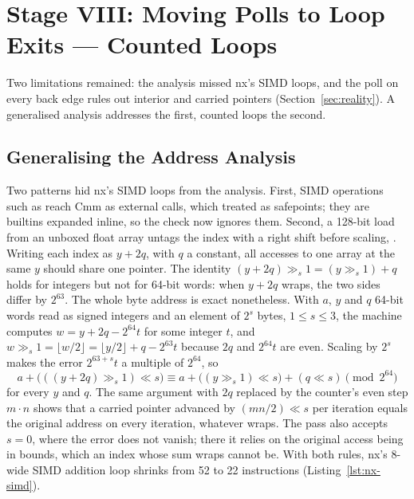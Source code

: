 \section{Stage VIII: Moving Polls to Loop Exits --- Counted Loops}
\label{sec:counted}

Two limitations remained: the analysis missed nx's SIMD loops, and the poll
on every back edge rules out interior and carried pointers
(Section~\ref{sec:reality}). A generalised analysis addresses the first,
counted loops the second.

\subsection{Generalising the Address Analysis}
Two patterns hid nx's SIMD loops from the analysis. First, SIMD operations
such as  reach Cmm as external calls, which
 treated as safepoints; they are \code{[@@noalloc]} builtins
expanded inline, so the check now ignores them. Second, a 128-bit load from
an unboxed float array untags the index with a right shift before scaling,
. Writing each index as $y + 2q$, with $q$
a constant, all accesses to one array at the same $y$ should share one
pointer. The identity $(y + 2q) \gg_s 1 = (y \gg_s 1) + q$ holds for
integers but not for 64-bit words: when $y + 2q$ wraps, the two sides differ
by $2^{63}$. The whole byte address is exact nonetheless. With $a$, $y$ and
$q$ 64-bit words read as signed integers and an element of $2^s$ bytes,
$1 \le s \le 3$, the machine computes $w = y + 2q - 2^{64}t$ for some integer
$t$, and $w \gg_s 1 = \lfloor w/2 \rfloor = \lfloor y/2 \rfloor + q -
2^{63}t$ because $2q$ and $2^{64}t$ are even. Scaling by $2^s$ makes the error
$2^{63+s}t$ a multiple of $2^{64}$, so
\[
  a + \bigl(((y + 2q) \gg_s 1) \ll s\bigr) \equiv
  a + \bigl((y \gg_s 1) \ll s\bigr) + (q \ll s) \pmod{2^{64}}
\]
for every $y$ and $q$. The same argument with $2q$ replaced by the counter's
even step $m\cdot n$ shows that a carried pointer advanced by
$(m n / 2) \ll s$ per iteration equals the original address on every
iteration, whatever wraps. The pass also accepts $s = 0$, where the error does
not vanish; there it relies on the original access being in bounds, which an
index whose sum wraps cannot be. With both rules, nx's 8-wide SIMD addition loop shrinks from 52 to 22 instructions
(Listing~\ref{lst:nx-simd}).

